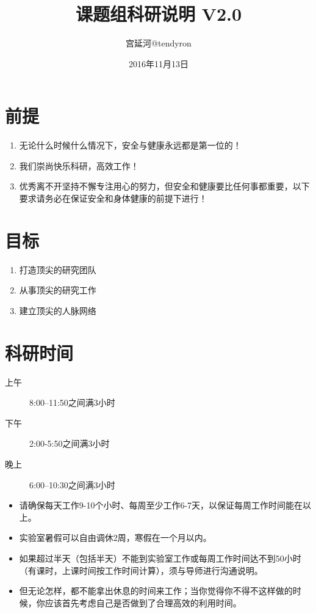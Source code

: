 \documentclass[a4paper，12pt]{article}
\title{课题组科研说明 V2.0} %
\author{宫延河@tendyron}
\date{2016年11月13日} %
\begin{document}
\maketitle

\section{前提}

\begin{enumerate}
\item 无论什么时候什么情况下，安全与健康永远都是第一位的！
\item 我们崇尚快乐科研，高效工作！
\item 优秀离不开坚持不懈专注用心的努力，但安全和健康要比任何事都重要，以下要求请务必在保证安全和身体健康的前提下进行！
\end{enumerate}

\section{目标}

\begin{enumerate}

\item 打造顶尖的研究团队

\item 从事顶尖的研究工作

\item 建立顶尖的人脉网络

\end{enumerate}

\section{科研时间}

\begin{description}

\item[上午] 8:00--11:50之间满3小时

\item[下午] 2:00-5:50之间满3小时

\item[晚上] 6:00--10:30之间满3小时

\end{description}

\begin{itemize}

\item 请确保每天工作9-10个小时、每周至少工作6-7天，以保证每周工作时间能在{\color{red}{60小时}}以上。

\item 实验室暑假可以自由调休2周，寒假在一个月以内。

\item 如果超过半天（包括半天）不能到实验室工作或每周工作时间达不到50小时（有课时，上课时间按工作时间计算），须与导师进行沟通说明。

\item 但无论怎样，都不能拿出休息的时间来工作；当你觉得你不得不这样做的时候，你应该首先考虑自己是否做到了合理高效的利用时间。

\end{itemize}
\end{document}
